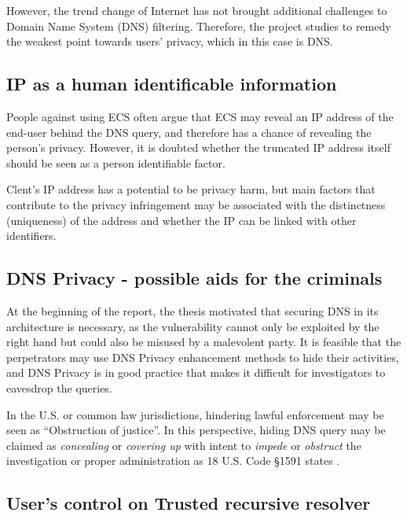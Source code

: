 However, the trend change of Internet has not brought additional challenges to Domain Name System (DNS) filtering. Therefore, the project studies to remedy the weakest point towards users' privacy, which in this case is DNS.

\subsection{IP as a human identificable information}
People against using ECS often argue that ECS may reveal an IP address of the end-user behind the DNS query, and therefore has a chance of revealing the person's privacy.
However, it is doubted whether the truncated IP address itself should be seen as a person identifiable factor.

Clent's IP address has a potential to be privacy harm, but main factors that contribute to the privacy infringement may be associated with the distinctness (uniqueness) of the address and whether the IP can be linked with other identifiers.

\subsection{DNS Privacy - possible aids for the criminals}
At the beginning of the report, the thesis motivated that securing DNS in its architecture is necessary, as the vulnerability cannot only be exploited by the right hand but could also be misused by a malevolent party.
It is feasible that the perpetrators may use DNS Privacy enhancement methods to hide their activities, and DNS Privacy is in good practice that makes it difficult for investigators to eavesdrop the queries.

In the U.S. or common law jurisdictions, hindering lawful enforcement may be seen as ``Obstruction of justice''.
In this perspective, hiding DNS query may be claimed as \textit{concealing} or \textit{covering up} with intent to \textit{impede} or \textit{obstruct} the investigation or proper administration as 18 U.S. Code \S 1591 states \cite{Obstructionofjustice}.

\subsection{User's control on Trusted recursive resolver}